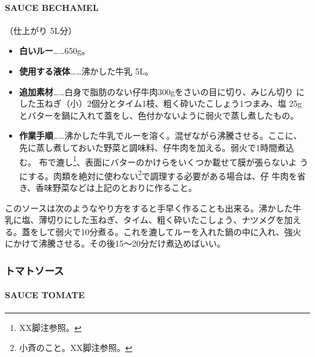 \documentclass[twoside,12Q,b5j]{escoffierltjsbook}
\begin{document}
\paragraph{SAUCE BECHAMEL}\label{sauce-bechamel}


（仕上がり 5L分）

\begin{itemize}
\item
  \textbf{白いルー}\ldots{}\ldots{}650g。
\item
  \textbf{使用する液体}\ldots{}\ldots{}沸かした牛乳 5L。
\item
  \textbf{追加素材}\ldots{}\ldots{}白身で脂肪のない仔牛肉300gをさいの目に切り、みじん切り
  にした玉ねぎ（小）2個分とタイム1枝、粗く砕いたこしょう1つまみ、塩
  25gとバターを鍋に入れて蓋をし、色付かないように弱火で蒸し煮したもの。
\item
  \textbf{作業手順}\ldots{}\ldots{}沸かした牛乳でルーを溶く。混ぜながら沸騰させる。ここに、
  先に蒸し煮しておいた野菜と調味料、仔牛肉を加える。弱火で1時間煮込む。
  布で漉し\footnote{XX脚注参照。}、表面にバターのかけらをいくつか載せて膜が張らないよ
  うにする。肉類を絶対に使わない\footnote{小斉のこと。XX脚注参照。}で調理する必要がある場合は、仔
  牛肉を省き、香味野菜などは上記のとおりに作ること。
\end{itemize}

このソースは次のようなやり方をすると手早く作ることも出来る。沸かした牛
乳に塩、薄切りにした玉ねぎ、タイム、粗く砕いたこしょう、ナツメグを加え
る。蓋をして弱火で10分煮る。これを漉してルーを入れた鍋の中に入れ、強火
にかけて沸騰させる。その後15〜20分だけ煮込めばいい。

\vspace*{1.7\zw}

\subsubsection{トマトソース}\label{ux30c8ux30deux30c8ux30bdux30fcux30b9}

\paragraph{SAUCE TOMATE}\label{sauce-tomate}

\end{document}
